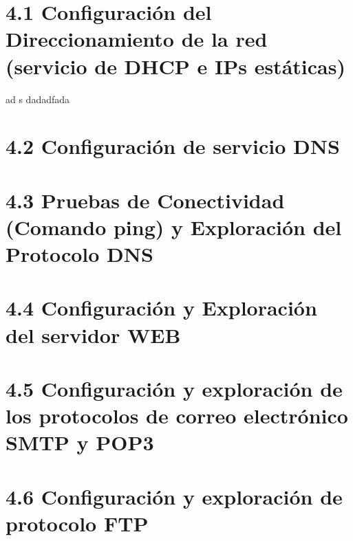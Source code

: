 \documentclass[10pt]{article}
\begin{document}
\section{4.1 Configuración del Direccionamiento de la red (servicio de DHCP e IPs estáticas)}
ad
s
dadadfada

\section{4.2 Configuración de servicio DNS}
\section{4.3 Pruebas de Conectividad (Comando ping) y Exploración del Protocolo DNS}
\section{4.4 Configuración y Exploración del servidor WEB}
\section{4.5 Configuración y exploración de los protocolos de correo electrónico SMTP y POP3}
\section{4.6 Configuración y exploración de protocolo FTP}
\end{document}

